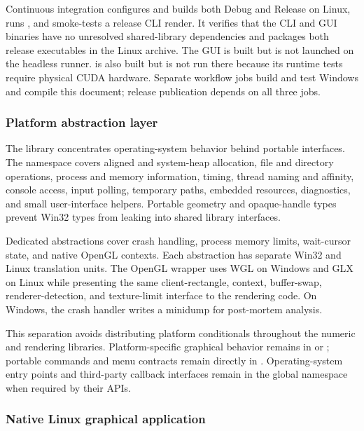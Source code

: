 Continuous integration configures and builds both Debug and Release on Linux,
runs , and smoke-tests a release CLI render. It verifies
that the CLI and GUI binaries have no unresolved shared-library dependencies
and packages both release executables in the Linux archive. The GUI is built
but is not launched on the headless runner.  is also
built but is not run there because its runtime tests require physical CUDA
hardware. Separate workflow jobs build and test Windows and compile this
document; release publication depends on all three jobs.

\subsubsection{Platform abstraction layer}
\label{subsec:platform-abstraction}

The  library concentrates operating-system behavior
behind portable interfaces. The  namespace covers aligned
and system-heap allocation, file and directory operations, process and memory
information, timing, thread naming and affinity, console access, input polling,
temporary paths, embedded resources, diagnostics, and small user-interface
helpers. Portable geometry and opaque-handle types prevent Win32 types from
leaking into shared library interfaces.

Dedicated abstractions cover crash handling, process memory limits, wait-cursor
state, and native OpenGL contexts. Each abstraction has separate Win32 and
Linux translation units. The OpenGL wrapper uses WGL on Windows and GLX on
Linux while presenting the same client-rectangle, context, buffer-swap,
renderer-detection, and texture-limit interface to the rendering code. On
Windows, the crash handler writes a  minidump for post-mortem
analysis.

This separation avoids distributing platform conditionals throughout the
numeric and rendering libraries. Platform-specific graphical behavior remains
in  or ; portable commands
and menu contracts remain directly in . Operating-system
entry points and third-party callback interfaces remain in the global namespace
when required by their APIs.

\subsubsection{Native Linux graphical application}
\label{subsec:linux-gui}

